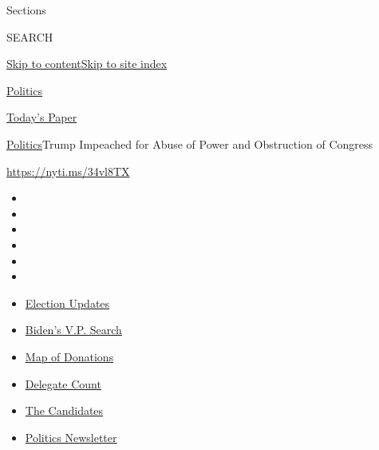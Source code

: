 Sections

SEARCH

\protect\hyperlink{site-content}{Skip to
content}\protect\hyperlink{site-index}{Skip to site index}

\href{https://www.nytimes.com/section/politics}{Politics}

\href{https://myaccount.nytimes.com/auth/login?response_type=cookie\&client_id=vi}{}

\href{https://www.nytimes.com/section/todayspaper}{Today's Paper}

\href{/section/politics}{Politics}\textbar{}Trump Impeached for Abuse of
Power and Obstruction of Congress

\url{https://nyti.ms/34vl8TX}

\begin{itemize}
\item
\item
\item
\item
\item
\item
\end{itemize}

\begin{itemize}
\item
  \href{https://www.nytimes.com/2020/07/31/us/elections/biden-vs-trump.html?action=click\&pgtype=Article\&state=default\&region=TOP_BANNER\&context=storylines_menu}{Election
  Updates}
\item
  \href{https://www.nytimes.com/article/biden-vice-president-2020.html?action=click\&pgtype=Article\&state=default\&region=TOP_BANNER\&context=storylines_menu}{Biden's
  V.P. Search}
\item
  \href{https://www.nytimes.com/interactive/2020/07/24/us/politics/trump-biden-campaign-donors.html?action=click\&pgtype=Article\&state=default\&region=TOP_BANNER\&context=storylines_menu}{Map
  of Donations}
\item
  \href{https://www.nytimes.com/interactive/2020/us/elections/delegate-count-primary-results.html?action=click\&pgtype=Article\&state=default\&region=TOP_BANNER\&context=storylines_menu}{Delegate
  Count}
\item
  \href{https://www.nytimes.com/interactive/2019/us/politics/2020-presidential-candidates.html?action=click\&pgtype=Article\&state=default\&region=TOP_BANNER\&context=storylines_menu}{The
  Candidates}
\item
  \href{https://www.nytimes.com/newsletters/politics?action=click\&pgtype=Article\&state=default\&region=TOP_BANNER\&context=storylines_menu}{Politics
  Newsletter}
\end{itemize}

